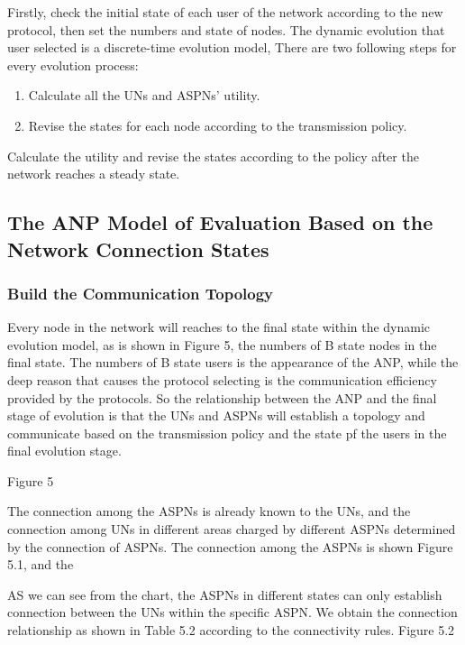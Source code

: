 \documentclass{article}
\begin{document}
Firstly, check the initial state of each user of the network according to the new protocol, then set the numbers and state
 of nodes. The dynamic evolution that user selected is a discrete-time evolution model, There are two following steps for 
 every evolution process:
\begin{enumerate}
    \item Calculate all the UNs and ASPNs' utility.
    \item Revise the states for each node according to the transmission policy.
\end{enumerate}
   Calculate the utility and revise the states according to the policy after the network reaches a steady state.
\subsection{The ANP Model of Evaluation Based on the Network Connection States}
\subsubsection{Build the Communication Topology}
Every node in the network will reaches to the final state within the dynamic evolution model, as is shown in Figure 5, 
the numbers of B state nodes in the final state. The numbers of B state users is the appearance of the ANP, while the deep reason 
that causes the protocol selecting is the communication efficiency provided by the protocols. So the relationship between 
the ANP and the final stage of evolution is that the UNs and ASPNs will establish a topology and communicate based on 
the transmission policy and the state pf the users in the final evolution stage.

Figure 5

The connection among the ASPNs is already known to the UNs, and the connection among UNs in different areas charged by different 
ASPNs determined by the connection of ASPNs. The connection among the ASPNs is shown Figure 5.1, and the

AS we can see from the chart, the ASPNs in different states can only establish connection between the UNs within the specific ASPN. 
We obtain the connection relationship as shown in Table 5.2 according to the connectivity rules.
Figure 5.2
\end{document}
